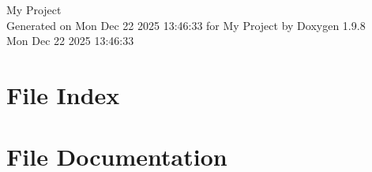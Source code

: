 \documentclass[twoside]{book}
\newcommand{\+}{\discretionary{\mbox{\scriptsize$\hookleftarrow$}}{}{}}
\newcommand{\clearemptydoublepage}{%
    \newpage{\pagestyle{empty}\cleardoublepage}%
  }
\begin{document}
  \raggedbottom
    \hypersetup{pageanchor=false,
                bookmarksnumbered=true,
                pdfencoding=unicode
               }
  \begin{titlepage}
  \vspace*{7cm}
  \begin{center}%
  {\Large My Project}\\
  \vspace*{1cm}
  {\large Generated on Mon Dec 22 2025 13\+:46\+:33 for My Project by Doxygen 1.9.8}\\
    \vspace*{0.5cm}
    {\small Mon Dec 22 2025 13:46:33}
  \end{center}
  \end{titlepage}
  \clearemptydoublepage
  \tableofcontents
  \clearemptydoublepage
  \hypersetup{pageanchor=true}

\chapter{File Index}

\chapter{File Documentation}


  \backmatter
  \newpage
  \clearemptydoublepage
  \printindex
\end{document}
